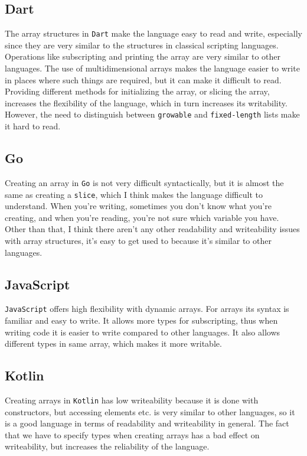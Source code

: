 \documentclass{article}
\begin{document}
\subsection{Dart} 
The array structures in \texttt{Dart} make the language easy to read and write, especially since they are very similar to the structures in classical scripting languages. Operations like subscripting and printing the array are very similar to other languages. 
The use of multidimensional arrays makes the language easier to write in places where such things are required, but it can make it difficult to read. Providing different methods for initializing the array, or slicing the array, increases the flexibility of the language, which in turn increases its writability.  However, the need to distinguish between \texttt{growable} and \texttt{fixed-length} lists make it hard to read.

\subsection{Go}
Creating an array in \texttt{Go} is not very difficult syntactically, but it is almost the same as creating a \texttt{slice}, which I think makes the language difficult to understand. When you're writing, sometimes you don't know what you're creating, and when you're reading, you're not sure which variable you have. Other than that, I think there aren't any other readability and writeability issues with array structures, it's easy to get used to because it's similar to other languages. 

\subsection{JavaScript}
\texttt{JavaScript} offers high flexibility with dynamic arrays. For arrays its syntax is familiar and easy to write. It allows more types for subscripting, thus when writing code it is easier to write compared to other languages. It also allows different types in same array, which makes it more writable.

\subsection{Kotlin}
Creating arrays in \texttt{Kotlin} has low writeability because it is done with constructors, but accessing elements etc. is very similar to other languages, so it is a good language in terms of readability and writeability in general. The fact that we have to specify types when creating arrays has a bad effect on writeability, but increases the reliability of the language.
\end{document}
